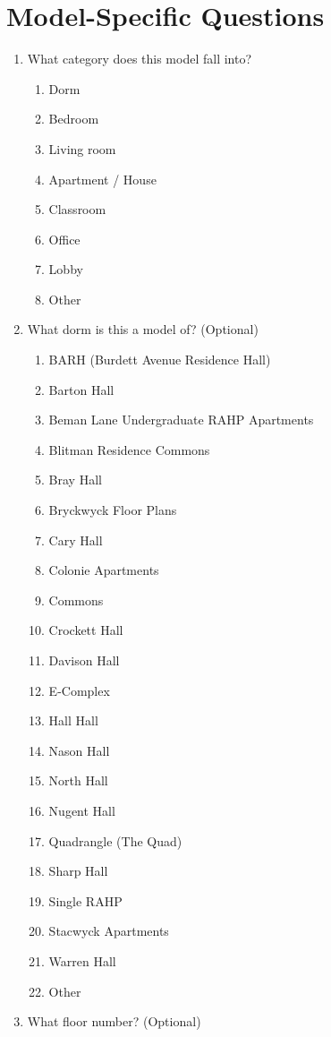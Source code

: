 \section{Model-Specific Questions}

\begin{enumerate}
\item What category does this model fall into?
\begin{enumerate}
  \item Dorm
  \item Bedroom
  \item Living room 
  \item Apartment / House
  \item Classroom
  \item Office
  \item Lobby
  \item Other
\end{enumerate}
\item What dorm is this a model of? (Optional)
\begin{enumerate}
\item BARH (Burdett Avenue Residence Hall)
\item Barton Hall
\item Beman Lane Undergraduate RAHP Apartments
\item Blitman Residence Commons
\item Bray Hall
\item Bryckwyck Floor Plans
\item Cary Hall
\item Colonie Apartments
\item Commons
\item Crockett Hall
\item Davison Hall
\item E-Complex
\item Hall Hall
\item Nason Hall
\item North Hall
\item Nugent Hall
\item Quadrangle (The Quad)
\item Sharp Hall
\item Single RAHP
\item Stacwyck Apartments
\item Warren Hall
\item Other
\end{enumerate}
\item What floor number? (Optional)

\end{enumerate}
